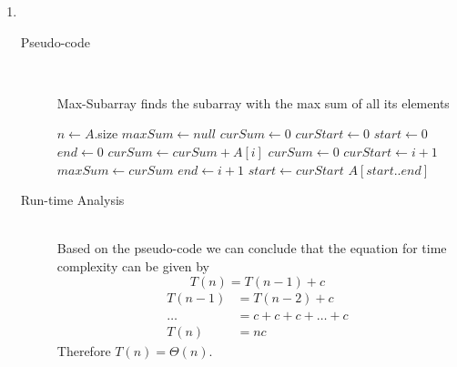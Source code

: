\documentclass[paper=a4, fontsize=11pt]{scrartcl} %
\numberwithin{equation}{section} %
\numberwithin{figure}{section} %
\numberwithin{table}{section} %
\begin{document}
\begin{enumerate}[label=\bfseries Algorithm \arabic*:]
    \item \hfill \\
    \begin{description}
        \item[Pseudo-code] \hfill \\
        \begin{algorithmc}
            \caption{Max-Subarray finds the subarray with the max sum of all its elements}
                \State $n \gets A$.size
                \State $maxSum \gets null$
                \State $curSum \gets 0$
                \State $curStart \gets 0$
                \State $start \gets 0$
                \State $end \gets 0$
                    \State $curSum \gets curSum + A[i]$
                        \State $curSum \gets 0$
                        \State $curStart \gets i + 1$
                    \EndIf
                        \State $maxSum \gets curSum$
                        \State $end \gets i + 1$
                        \State $start \gets curStart$
                    \EndIf
                \EndFor
                \State \Return $A[start..end]$
            \EndFunction
        \end{algorithmc}
        \item[Run-time Analysis] \hfill \\
        Based on the pseudo-code we can conclude that the equation for 
        time complexity can be given by
        \[ T(n) = T(n - 1) + c \]
        \begin{align*}
            T(n - 1) & = T(n - 2) + c \\
            \ldots & = c + c + c + \ldots + c \\
            T(n) & = nc
        \end{align*}
        Therefore $T(n) = \Theta(n)$.
    \end{description}
\end{enumerate}
\end{document}
